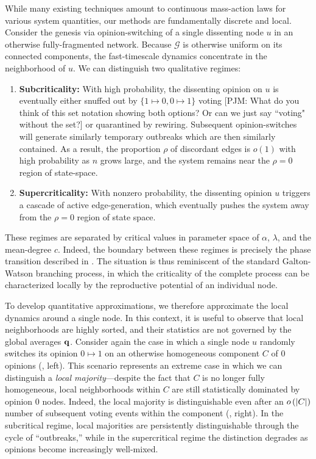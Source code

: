 \documentclass[review, onefignum, onetabnum]{siamart171218}
\newcommand{\pjm}[1]{{\color{blue}[PJM: #1]}}
\begin{document}
	    While many existing techniques amount to continuous mass-action laws for various system quantities, our methods are fundamentally discrete and local. 
	    Consider the genesis via opinion-switching of a single dissenting node $u$ in an otherwise fully-fragmented network.  
	    Because $\mathcal{G}$ is otherwise uniform on its connected components, the fast-timescale dynamics concentrate in the neighborhood of $u$. 
    	We can distinguish two qualitative regimes: 
    	\begin{enumerate}
    		\item \textbf{Subcriticality:} With high probability, the dissenting opinion on $u$ is eventually either snuffed out by $\{1\mapsto 0,0\mapsto 1\}$ voting \pjm{What do you think of this set notation showing both options? Or can we just say ``voting" without the set?} or quarantined by rewiring. 
    		Subsequent opinion-switches will generate similarly temporary outbreaks which are then similarly contained.   
    		As a result, the proportion $\rho$ of discordant edges is $o(1)$ with high probability as $n$ grows large, and the system remains near the $\rho = 0$ region of state-space. 
    		\item \textbf{Supercriticality:} With nonzero probability, the dissenting opinion $u$ triggers a cascade of active edge-generation, which eventually pushes the system away from the $\rho = 0$ region of state space. 
    	\end{enumerate}
    	These regimes are separated by critical values in parameter space of $\alpha$, $\lambda$, and the mean-degree $c$. 
    	Indeed, the boundary between these regimes is precisely the phase transition described in . 
    	The situation is thus reminiscent of the standard Galton-Watson branching process, in which the criticality of the complete process can be characterized locally by the reproductive potential of an individual node. 
    	
    	To develop quantitative approximations, we therefore approximate the local dynamics around a single node. 
    	In this context, it is useful to observe that local neighborhoods are highly sorted, and their statistics are not governed by the global averages $\mathbf{q}$. 
    	Consider again the case in which a single node $u$ randomly switches its opinion $0 \mapsto 1$ on an otherwise homogeneous component $C$ of $0$ opinions (, left). 
		This scenario represents an extreme case in which we can distinguish a \emph{local majority}---despite the fact that $C$ is no longer fully homogeneous, local neighborhoods within $C$ are still statistically dominated by opinion $0$ nodes. 
		Indeed, the local majority is distinguishable even after an $o\left(\left|C\right|\right)$ number of subsequent voting events within the component (, right). 
        In the subcritical regime, local majorities are persistently distinguishable through the cycle of ``outbreaks,'' while in the supercritical regime the distinction degrades as opinions become increasingly well-mixed. 
        
\end{document}
